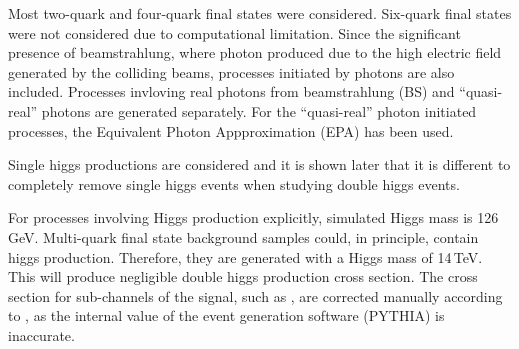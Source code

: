 
Most two-quark and four-quark final states were considered. Six-quark final states were not considered due to computational limitation. Since the significant presence of beamstrahlung, where photon produced due to the high electric field generated by the colliding beams, processes initiated by photons are also included. Processes invloving real photons from beamstrahlung (BS) and ``quasi-real'' photons are generated separately. For the ``quasi-real'' photon initiated processes, the Equivalent Photon Appproximation (EPA) has been used.

Single higgs productions are considered and it is shown later that it is different to completely remove single higgs events when studying double higgs events.




For processes involving Higgs production explicitly, simulated Higgs mass is 126\,GeV. Multi-quark final state background samples could, in principle, contain higgs production. Therefore, they are generated with a Higgs mass of 14\,TeV. This will produce negligible double higgs production cross section. The cross section for sub-channels of the signal, such as \eeToHHbbWW, are corrected manually according to \cite{Dittmaier:2012vm}, as the internal value of the event generation software (PYTHIA) is inaccurate.



